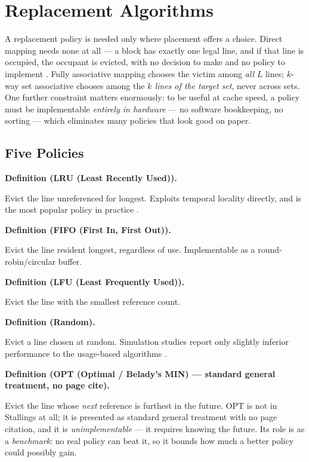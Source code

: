 \documentclass[11pt]{article}
\newenvironment{definitionbox}[1]{%
  \par\noindent\textbf{Definition (#1).}\ \itshape
}{\par\vspace{0.3em}}
\begin{document}
\section{Replacement Algorithms}
\label{sec:replacement}

A replacement policy is needed only where placement offers a choice. Direct mapping needs none at all --- a block has exactly one legal line, and if that line is occupied, the occupant is evicted, with no decision to make and no policy to implement \cite[\S5.2 Replacement Algorithms, PDF p.~203]{Stallings2015_computer_organization}. Fully associative mapping chooses the victim among \emph{all} $L$ lines; $k$-way set associative chooses among the \emph{$k$ lines of the target set}, never across sets. One further constraint matters enormously: to be useful at cache speed, a policy must be implementable \emph{entirely in hardware} --- no software bookkeeping, no sorting --- which eliminates many policies that look good on paper.

\subsection{Five Policies}

\begin{definitionbox}{LRU (Least Recently Used)}
Evict the line unreferenced for longest. Exploits temporal locality directly, and is the most popular policy in practice \cite[\S5.2, PDF p.~203]{Stallings2015_computer_organization}.
\end{definitionbox}

\begin{definitionbox}{FIFO (First In, First Out)}
Evict the line resident longest, regardless of use. Implementable as a round-robin/circular buffer.
\end{definitionbox}

\begin{definitionbox}{LFU (Least Frequently Used)}
Evict the line with the smallest reference count.
\end{definitionbox}

\begin{definitionbox}{Random}
Evict a line chosen at random. Simulation studies report only slightly inferior performance to the usage-based algorithms \cite[\S5.2, PDF p.~203]{Stallings2015_computer_organization}.
\end{definitionbox}

\begin{definitionbox}{OPT (Optimal / Belady's MIN) --- standard general treatment, no page cite}
Evict the line whose \emph{next} reference is furthest in the future. OPT is not in Stallings at all; it is presented as standard general treatment with no page citation, and it is \emph{unimplementable} --- it requires knowing the future. Its role is as a \emph{benchmark}: no real policy can beat it, so it bounds how much a better policy could possibly gain.
\end{definitionbox}
\end{document}
